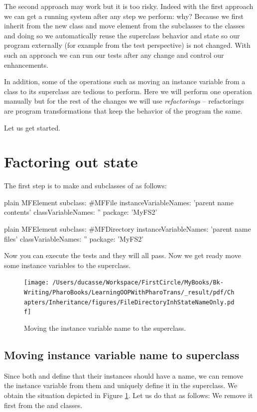 \documentclass[10pt,twoside,english]{_support/latex/sbabook/sbabook}
\begin{document}
The second approach may work but it is too risky. Indeed with the first approach we can get a running system after any step we perform: why? Because we first inherit from the new class and move element from the subclasses to the classes and doing so we automatically reuse the superclass behavior and state so our program externally (for example from the test perspective) is not changed. With such an approach we can run our tests after any change and control our enhancements.

In addition, some of the operations such as moving an instance variable from a class to its superclass are tedious to perform. Here we will perform one operation manually but for the rest of the changes we will use \textit{refactorings} -- refactorings are program transformations that keep the behavior of the program the same.

Let us get started.
\section{Factoring out state}
The first step is to make  and  subclasses of  as follows:

\begin{displaycode}{plain}
MFElement subclass: #MFFile
	instanceVariableNames: 'parent name contents'
	classVariableNames: ''
	package: 'MyFS2'
\end{displaycode}

\begin{displaycode}{plain}
MFElement subclass: #MFDirectory
	instanceVariableNames: 'parent name files'
	classVariableNames: ''
	package: 'MyFS2'
\end{displaycode}

Now you can execute the tests and they will all pass. Now we get ready move some instance variables to the superclass.


\begin{figure}

\begin{center}
\texttt{[image: /Users/ducasse/Workspace/FirstCircle/MyBooks/Bk-Writing/PharoBooks/LearningOOPWithPharoTrans/\_result/pdf/Chapters/Inheritance/figures/FileDirectoryInhStateNameOnly.pdf]}\caption{Moving the instance variable name to the superclass.\label{FileDirectoryInhStateNameOnly}}\end{center}
\end{figure}

\subsection{Moving instance variable name to superclass}
Since both  and  define that their instances should have a name, we can remove the instance variable  from them and uniquely define it in the superclass. We obtain the situation depicted in Figure \ref{FileDirectoryInhStateNameOnly}.
Let us do that as follows: We remove it first from the  and  classes.
\end{document}
